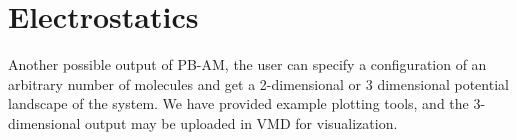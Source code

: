 \section{Electrostatics} Another possible output of PB-AM, the user can specify a configuration of an arbitrary number of molecules and get a 2-dimensional or 3 dimensional potential landscape of the system. We have provided example plotting tools, and the 3-dimensional output may be uploaded in VMD for visualization.



\clearpage